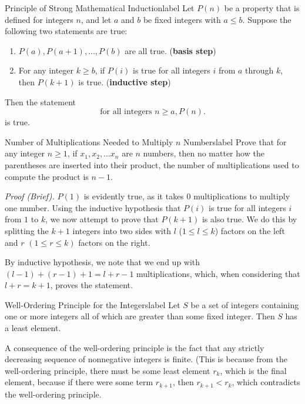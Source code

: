\documentclass[a4paper]{report}
\begin{document}
\begin{definition}{Principle of Strong Mathematical Induction}{label}
    Let $P(n)$ be a property that is defined for integers $n$, and let $a$ and $b$ be fixed integers
    with $a \le b$. Suppose the following two statements are true:
    \begin{enumerate}
        \item $P(a), P(a+1), \ldots, P(b)$ are all true. (\textbf{basis step})
        \item For any integer $k \ge b$, if $P(i)$ is true for all integers $i$ from $a$ through $k$,
            then $P(k+1)$ is true. (\textbf{inductive step})
    \end{enumerate}
    Then the statement \[
        \text{for all integers } n \ge a, P(n)
    .\] 
    is true.
\end{definition}

\begin{example}{Number of Multiplications Needed to Multiply $n$ Numbers}{label}
    Prove that for any integer $n \ge 1$, if $x_1, x_2, \ldots x_n$ are $n$ numbers, then no matter
    how the parentheses are inserted into their product, the number of multiplications used
    to compute the product is $n - 1$.
\end{example}

\emph{Proof (Brief).} $P(1)$ is evidently true, as it takes $0$ multiplications to multiply one number.
Using the inductive hypothesis that $P(i)$ is true for all integers $i$ from $1$ to $k$, we now
attempt to prove that $P(k+1)$ is also true. We do this by splitting the $k + 1$ integers into two
sides with $l$ ($1 \le l \le k$) factors on the left and $r$ $(1 \le r \le k)$ factors on the right.

By inductive hypothesis, we note that we end up with $(l-1)+(r-1)+1=l+r-1$ multiplications, which, when
considering that $l + r = k + 1$, proves the statement.

\begin{definition}{Well-Ordering Principle for the Integers}{label}
    Let $S$ be a set of integers containing one or more integers all of which are greater than some fixed integer. Then $S$ has a least element.
\end{definition}

A consequence of the well-ordering principle is the fact that any strictly decreasing sequence of nonnegative integers is finite. (This is because
from the well-ordering principle, there must be some least element $r_k$, which is the final element, because if there were some term $r_{k+1}$, then
$r_{k+1}<r_k$, which contradicts the well-ordering principle.
\end{document}
